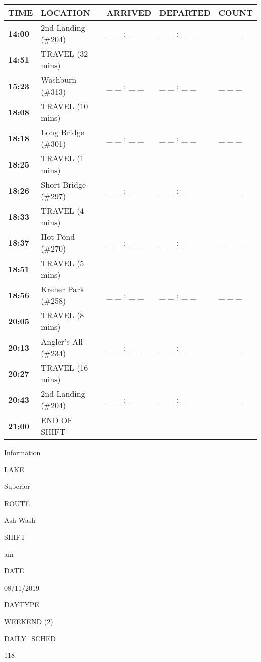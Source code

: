 \documentclass[]{article}
\begin{document}
\begin{tabular}{>{\bfseries}lllll}
\toprule
\textbf{TIME} & \textbf{LOCATION} & \textbf{ARRIVED} & \textbf{DEPARTED} & \textbf{COUNT}\\
\midrule
14:00 & 2nd Landing (\#204) & \_ \_ : \_ \_ & \_ \_ : \_ \_ & \_ \_ \_\\
14:51 & TRAVEL (32 mins) &  &  & \\
15:23 & Washburn (\#313) & \_ \_ : \_ \_ & \_ \_ : \_ \_ & \_ \_ \_\\
18:08 & TRAVEL (10 mins) &  &  & \\
18:18 & Long Bridge (\#301) & \_ \_ : \_ \_ & \_ \_ : \_ \_ & \_ \_ \_\\
18:25 & TRAVEL (1 mins) &  &  & \\
18:26 & Short Bridge (\#297) & \_ \_ : \_ \_ & \_ \_ : \_ \_ & \_ \_ \_\\
18:33 & TRAVEL (4 mins) &  &  & \\
18:37 & Hot Pond (\#270) & \_ \_ : \_ \_ & \_ \_ : \_ \_ & \_ \_ \_\\
18:51 & TRAVEL (5 mins) &  &  & \\
18:56 & Kreher Park (\#258) & \_ \_ : \_ \_ & \_ \_ : \_ \_ & \_ \_ \_\\
20:05 & TRAVEL (8 mins) &  &  & \\
20:13 & Angler's All (\#234) & \_ \_ : \_ \_ & \_ \_ : \_ \_ & \_ \_ \_\\
20:27 & TRAVEL (16 mins) &  &  & \\
20:43 & 2nd Landing (\#204) & \_ \_ : \_ \_ & \_ \_ : \_ \_ & \_ \_ \_\\
21:00 & END OF SHIFT &  &  & \\
\bottomrule
\end{tabular}\newpage

Information

LAKE

Superior

ROUTE

Ash-Wash

SHIFT

am

DATE

08/11/2019

DAYTYPE

WEEKEND (2)

DAILY\_SCHED

118

\vspace{24pt}
\end{document}
